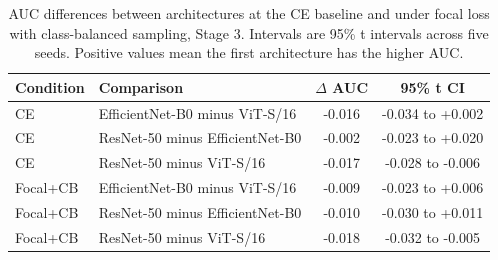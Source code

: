 \begin{table}[t]
\centering
\small
\caption{AUC differences between architectures at the CE baseline and under focal loss with class-balanced sampling, Stage 3. Intervals are 95\% t intervals across five seeds. Positive values mean the first architecture has the higher AUC.}
\label{tab:auctests}
\begin{tabular}{llcc}
\toprule
Condition & Comparison & $\Delta$ AUC & 95\% t CI \\
\midrule
CE & EfficientNet-B0 minus ViT-S/16 & -0.016 & -0.034 to +0.002 \\
CE & ResNet-50 minus EfficientNet-B0 & -0.002 & -0.023 to +0.020 \\
CE & ResNet-50 minus ViT-S/16 & -0.017 & -0.028 to -0.006 \\
\midrule
Focal+CB & EfficientNet-B0 minus ViT-S/16 & -0.009 & -0.023 to +0.006 \\
Focal+CB & ResNet-50 minus EfficientNet-B0 & -0.010 & -0.030 to +0.011 \\
Focal+CB & ResNet-50 minus ViT-S/16 & -0.018 & -0.032 to -0.005 \\
\bottomrule
\end{tabular}
\end{table}
